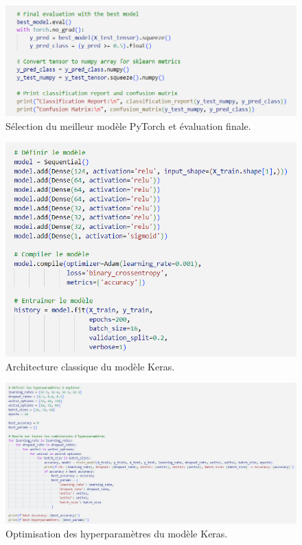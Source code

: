 \begin{figure}[H]
    \centering
    \includegraphics[width=0.8\linewidth]{capture_sas_77.png}
    \caption{Sélection du meilleur modèle PyTorch et évaluation finale.}
    \label{753}
\end{figure}
\vspace{10pt}

\begin{figure}[H]
    \centering
    \includegraphics[width=0.7\linewidth]{capture_sas_78.png}
    \caption{Architecture classique du modèle Keras.}
    \label{96}
\end{figure}
\vspace{10pt}

\begin{figure}[H]
    \centering
    \includegraphics[width=0.9\linewidth]{capture_sas_79.png}
    \caption{Optimisation des hyperparamètres du modèle Keras.}
    \label{op}
\end{figure}
\vspace{10pt}

